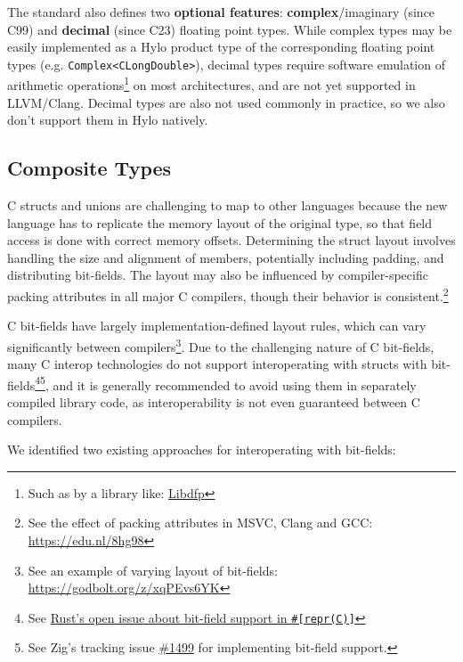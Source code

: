 The standard also defines two \textbf{optional features}: \textbf{complex}/imaginary (since C99) and \textbf{decimal} (since C23) floating point types. While complex types may be easily implemented as a Hylo product type of the corresponding floating point types (e.g. \texttt{Complex<CLongDouble>}), decimal types  require software emulation of arithmetic operations\footnote{Such as by a library like: \href{https://github.com/libdfp/libdfp}{Libdfp}} on most architectures, and are not yet supported in LLVM/Clang\cite{no-support-llvm-decimals}. Decimal types are also not used commonly in practice, so we also don't support them in Hylo natively.

\subsection{Composite Types}

C structs and unions are challenging to map to other languages because the new language has to replicate the memory layout of the original type, so that field access is done with correct memory offsets. Determining the struct layout involves handling the size and alignment of members, potentially including padding, and distributing bit-fields. The layout may also be influenced by compiler-specific packing attributes in all major C compilers, though their behavior is consistent.\footnote{See the effect of packing attributes in MSVC, Clang and GCC: \url{https://edu.nl/8hg98}}

C bit-fields have largely implementation-defined layout rules, which can vary significantly between compilers\footnote{See an example of varying layout of bit-fields: \url{https://godbolt.org/z/xqPEvs6YK}}. Due to the challenging nature of C bit-fields, many C interop technologies do not support interoperating with structs with bit-fields\footnote{See \href{https://github.com/rust-lang/rfcs/issues/314}{Rust's open issue about bit-field support in \texttt{\#[repr(C)]}}}\footnote{See Zig's tracking issue \href{https://github.com/ziglang/zig/issues/1499}{\#1499} for implementing bit-field support.}, and it is generally recommended to avoid using them in separately compiled library code, as interoperability is not even guaranteed between C compilers.

We identified two existing approaches for interoperating with bit-fields:

